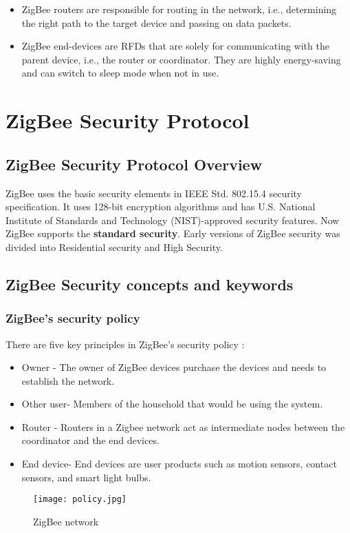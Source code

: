 \documentclass[conference]{IEEEtran}
\begin{document}
\begin{itemize}
    \item ZigBee routers are responsible for routing in the network, i.e., determining the right path to the target device and passing on data packets\cite{DrahtlosZigbee}.
    \item ZigBee end-devices are RFDs that are solely for communicating with the parent device, i.e., the router or coordinator. They are highly energy-saving and can switch to sleep mode when not in use\cite{DrahtlosZigbee}.
\end{itemize}

\section{ZigBee Security Protocol }

\subsection{ZigBee Security Protocol Overview}
ZigBee uses the basic security elements in  IEEE Std. 802.15.4 security specification. It uses 128-bit encryption algorithms and has U.S. National Institute of Standards and Technology (NIST)-approved security features. Now ZigBee supports the \textbf{standard security}. Early versions of ZigBee security was divided into Residential security and High Security.  \cite{Security_AN1233}

\subsection{ZigBee Security concepts and keywords}
\subsubsection{ZigBee’s security policy}
There are five key principles in ZigBee's security policy :
\begin{itemize}
    \item Owner - The owner of ZigBee devices purchase the devices and needs to establish the network.
    \item Other user- Members of the household that would be using the system.
    \item Router - Routers in a Zigbee network act as intermediate nodes between the coordinator and the end devices.
    \item End device-  End devices are user products such as motion sensors, contact sensors, and smart light bulbs.\cite{Security_Analysis}
\end{itemize}
\begin{figure}
    \centering
    \texttt{[image: policy.jpg]}
    \caption{ZigBee network\cite{Security_Analysis}}
    \label{Security_Analysis}
\end{figure}
\end{document}
